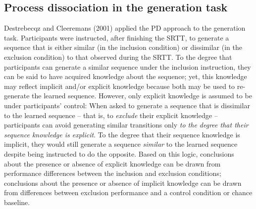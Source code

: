 \documentclass[floatsintext,man]{apa6}
\begin{document}
\subsection{Process dissociation in the generation
task}\label{process-dissociation-in-the-generation-task}

Destrebecqz and Cleeremans (2001) applied the PD approach to the
generation task. Participants were instructed, after finishing the SRTT,
to generate a sequence that is either similar (in the inclusion
condition) or dissimilar (in the exclusion condition) to that observed
during the SRTT. To the degree that participants can generate a similar
sequence under the inclusion instruction, they can be said to have
acquired knowledge about the sequence; yet, this knowledge may reflect
implicit and/or explicit knowledge because both may be used to
re-generate the learned sequence. However, only explicit knowledge is
assumed to be under participants' control: When asked to generate a
sequence that is dissimilar to the learned sequence -- that is, to
\emph{exclude} their explicit knowledge -- participants can avoid
generating similar transitions only \emph{to the degree that their
sequence knowledge is explicit}. To the degree that their sequence
knowledge is implicit, they would still generate a sequence
\emph{similar} to the learned sequence despite being instructed to do
the opposite. Based on this logic, conclusions about the presence or
absence of explicit knowledge can be drawn from performance differences
between the inclusion and exclusion conditions; conclusions about the
presence or absence of implicit knowledge can be drawn from differences
between exclusion performance and a control condition or chance
baseline.
\end{document}
